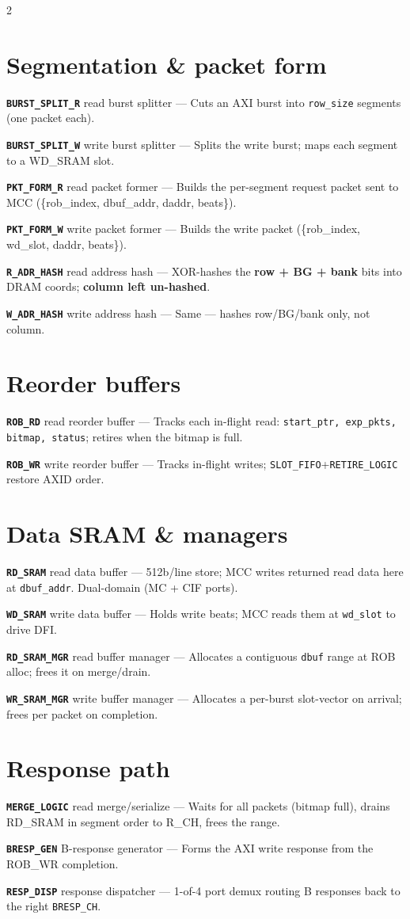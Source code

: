 \documentclass[9pt]{extarticle}
\newcommand{\blk}[3]{\noindent\textbf{\texttt{#1}}\; {\footnotesize\color{ff}#2}\; --- #3\par\vspace{1.5pt}}
\begin{document}
\begin{multicols}{2}
\section{Segmentation \& packet form}
\blk{BURST\_SPLIT\_R}{read burst splitter}{Cuts an AXI burst into \texttt{row\_size} segments (one packet each).}
\blk{BURST\_SPLIT\_W}{write burst splitter}{Splits the write burst; maps each segment to a WD\_SRAM slot.}
\blk{PKT\_FORM\_R}{read packet former}{Builds the per-segment request packet sent to MCC (\{rob\_index, dbuf\_addr, daddr, beats\}).}
\blk{PKT\_FORM\_W}{write packet former}{Builds the write packet (\{rob\_index, wd\_slot, daddr, beats\}).}
\blk{R\_ADR\_HASH}{read address hash}{XOR-hashes the \textbf{row + BG + bank} bits into DRAM coords; \textbf{column left un-hashed}.}
\blk{W\_ADR\_HASH}{write address hash}{Same --- hashes row/BG/bank only, not column.}

\section{Reorder buffers}
\blk{ROB\_RD}{read reorder buffer}{Tracks each in-flight read: \texttt{start\_ptr, exp\_pkts, bitmap, status}; retires when the bitmap is full.}
\blk{ROB\_WR}{write reorder buffer}{Tracks in-flight writes; \texttt{SLOT\_FIFO}+\texttt{RETIRE\_LOGIC} restore AXID order.}

\section{Data SRAM \& managers}
\blk{RD\_SRAM}{read data buffer}{512b/line store; MCC writes returned read data here at \texttt{dbuf\_addr}. Dual-domain (MC + CIF ports).}
\blk{WD\_SRAM}{write data buffer}{Holds write beats; MCC reads them at \texttt{wd\_slot} to drive DFI.}
\blk{RD\_SRAM\_MGR}{read buffer manager}{Allocates a contiguous \texttt{dbuf} range at ROB alloc; frees it on merge/drain.}
\blk{WR\_SRAM\_MGR}{write buffer manager}{Allocates a per-burst slot-vector on arrival; frees per packet on completion.}

\section{Response path}
\blk{MERGE\_LOGIC}{read merge/serialize}{Waits for all packets (bitmap full), drains RD\_SRAM in segment order to R\_CH, frees the range.}
\blk{BRESP\_GEN}{B-response generator}{Forms the AXI write response from the ROB\_WR completion.}
\blk{RESP\_DISP}{response dispatcher}{1-of-4 port demux routing B responses back to the right \texttt{BRESP\_CH}.}


\end{multicols}
\end{document}
